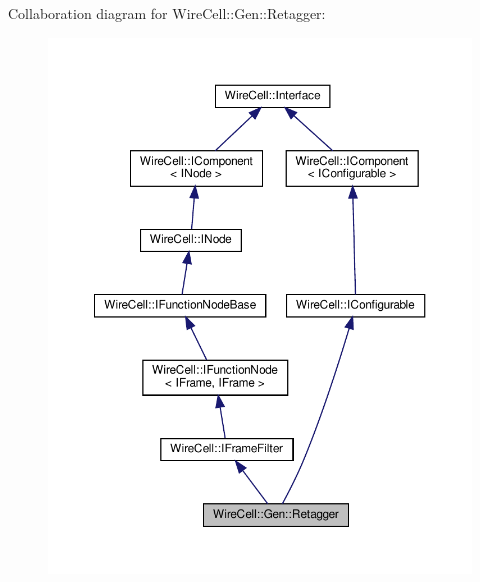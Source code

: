 Collaboration diagram for Wire\+Cell\+:\+:Gen\+:\+:Retagger\+:
\nopagebreak
\begin{figure}[H]
\begin{center}
\leavevmode
\includegraphics[width=350pt]{class_wire_cell_1_1_gen_1_1_retagger__coll__graph}
\end{center}
\end{figure}
